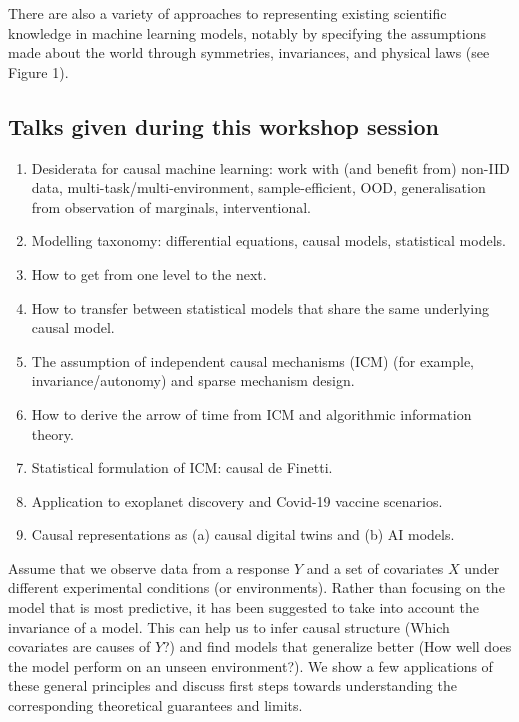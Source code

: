 There are also a variety of approaches to representing existing
scientific knowledge in machine learning models, notably by specifying
the assumptions made about the world through symmetries, invariances,
and physical laws (see Figure 1).

\subsection{Talks given during this workshop session}

\license

\begin{enumerate}
\item Desiderata for causal machine learning: work with (and benefit from) non-IID data, multi-task/multi-environment, sample-efficient, OOD, generalisation from observation of marginals, interventional.
 \item Modelling taxonomy: differential equations, causal models, statistical models.
 \item How to get from one level to the next.
\item How to transfer between statistical models that share the same underlying causal model. 
\item The assumption of independent causal mechanisms (ICM) (for example, invariance/autonomy) and sparse mechanism design. 
 \item How to derive the arrow of time from ICM and algorithmic information theory.
 \item Statistical formulation of ICM: causal de Finetti.
 \item Application to exoplanet discovery and Covid-19 vaccine scenarios.
 \item Causal representations as (a) causal digital twins and (b) AI models.
\end{enumerate}

\license

Assume that we observe data from a response $Y$ and a set of covariates $X$ under different experimental conditions (or environments). Rather than focusing on the model that is most predictive, it has been suggested to take into account the invariance of a model. This can help us to infer causal structure (Which covariates are causes of $Y$?) and find models that generalize better (How well does the model perform on an unseen environment?). We show a few applications of these general principles and discuss first steps towards understanding the corresponding theoretical guarantees and limits.

